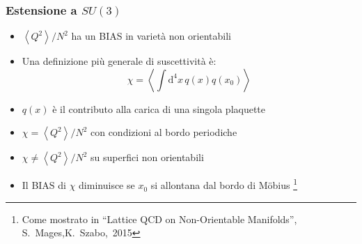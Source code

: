 \begin{frame}
    \begin{center}
    \end{center}
\end{frame}

\begin{frame}
    \frametitle{Estensione a $SU(3)$}
    \begin{itemize}
        \item $\left<Q^2\right>/N^2$ ha un BIAS in varietà non orientabili
        \item Una definizione più generale di suscettività è:
            $$\chi = \left<\int\mathrm d^4x\,q(x)q(x_0)\right>$$
        \item $q(x)$ è il contributo alla carica di una singola plaquette
        \item $\chi = \left<Q^2\right>/N^2$ con condizioni al bordo periodiche
        \item $\chi \neq \left<Q^2\right>/N^2$ su superfici non orientabili
        \item Il BIAS di $\chi$ diminuisce se $x_0$ si allontana dal bordo di M\"obius%
            \footnote{Come mostrato in ``Lattice QCD on Non-Orientable Manifolds'', \mbox{S. Mages},\mbox{K. Szabo, 2015}}
    \end{itemize}
\end{frame}

